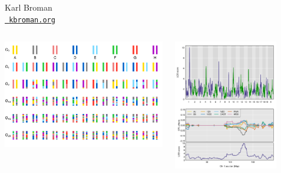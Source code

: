 \documentclass[aspectratio=169,12pt,t]{beamer}
\begin{document}
{\begin{frame}{Karl Broman \\[-6pt]
    \href{https://kbroman.org}{\tt \small \color{foreground} kbroman.org}}
\begin{columns}
\begin{column}{0.3\textwidth}
      \includegraphics[height=0.4\textheight]{Figs/hs_light.pdf}

    \end{column}

    \begin{column}{0.45\textwidth}
      \vspace{-10mm}

      \includegraphics[width=0.8\textwidth]{Figs/lod_curves.png}

    \end{column}

  \end{columns}


\end{frame}


}
\end{document}
